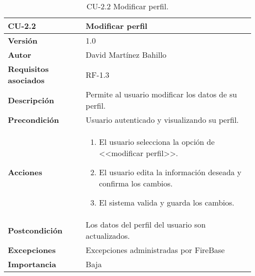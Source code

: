 \begin{table}[p]
	\centering
	\begin{tabularx}{\linewidth}{ p{0.21\columnwidth} p{0.71\columnwidth} }
		\toprule
		\textbf{CU-2.2}    & \textbf{Modificar perfil}\\
		\midrule
		\textbf{Versión}              & 1.0    \\
		\textbf{Autor}                & David Martínez Bahillo \\
		\textbf{Requisitos asociados} & RF-1.3 \\
		\textbf{Descripción}          & Permite al usuario modificar los datos de su perfil. \\
		\textbf{Precondición}         & Usuario autenticado y visualizando su perfil. \\
		\textbf{Acciones}             &
		\parbox[t]{\linewidth}{
			\begin{enumerate}
				\item El usuario selecciona la opción de <<modificar perfil>>.
				\item El usuario edita la información deseada y confirma los cambios.
				\item El sistema valida y guarda los cambios.
			\end{enumerate}
		} \\
		\textbf{Postcondición}        & Los datos del perfil del usuario son actualizados. \\
		\textbf{Excepciones}          & Excepciones administradas por FireBase \\
		\textbf{Importancia}          & Baja  \\
		\bottomrule
	\end{tabularx}
	\caption{CU-2.2 Modificar perfil.}
\end{table}


